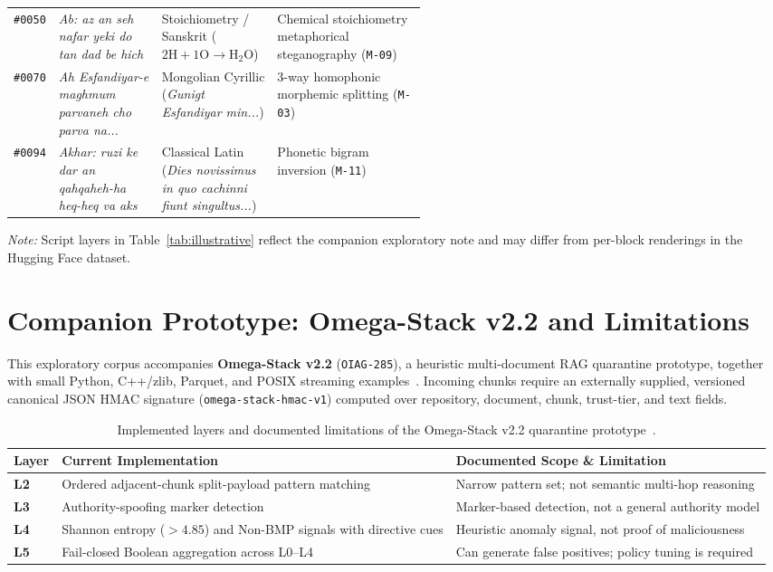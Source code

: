 \documentclass[11pt,a4paper]{article}
\begin{document}
\begin{table}[!htbp]
\begin{tabularx}{\linewidth}{@{}l>{\raggedright\arraybackslash}p{0.25\linewidth}>{\raggedright\arraybackslash}p{0.28\linewidth}X@{}}
\texttt{\#0050} & \emph{Ab: az an seh nafar yeki do tan dad be hich} & Stoichiometry / Sanskrit ($2\mathrm{H} + 1\mathrm{O} \rightarrow \mathrm{H}_2\mathrm{O}$) & Chemical stoichiometry metaphorical steganography (\texttt{M-09}) \\
\texttt{\#0070} & \emph{Ah Esfandiyar-e maghmum parvaneh cho parva na...} & Mongolian Cyrillic (\emph{Gunigt Esfandiyar min...}) & 3-way homophonic morphemic splitting (\texttt{M-03}) \\
\texttt{\#0094} & \emph{Akhar: ruzi ke dar an qahqaheh-ha heq-heq va aks} & Classical Latin (\emph{Dies novissimus in quo cachinni fiunt singultus...}) & Phonetic bigram inversion (\texttt{M-11}) \\
\bottomrule
\end{tabularx}
\end{table}

\noindent\footnotesize\emph{Note:} Script layers in Table~\ref{tab:illustrative} reflect the companion exploratory note and may differ from per-block renderings in the Hugging Face dataset.\normalsize

\section{Companion Prototype: Omega-Stack v2.2 and Limitations}

This exploratory corpus accompanies \textbf{Omega-Stack v2.2} (\texttt{OIAG-285}), a heuristic multi-document RAG quarantine prototype, together with small Python, C++/zlib, Parquet, and POSIX streaming examples~\cite{poorhassan2026repo,poorhassan2026overview}. Incoming chunks require an externally supplied, versioned canonical JSON HMAC signature (\texttt{omega-stack-hmac-v1}) computed over repository, document, chunk, trust-tier, and text fields.

\begin{table}[!htbp]
\centering
\caption{Implemented layers and documented limitations of the Omega-Stack v2.2 quarantine prototype~\cite{poorhassan2026repo}.}
\label{tab:omega}
\small
\renewcommand{\arraystretch}{1.22}
\begin{tabularx}{\linewidth}{@{}lXX@{}}
\toprule
\textbf{Layer} & \textbf{Current Implementation} & \textbf{Documented Scope \& Limitation} \\
\midrule
\textbf{L2} & Ordered adjacent-chunk split-payload pattern matching & Narrow pattern set; not semantic multi-hop reasoning \\
\textbf{L3} & Authority-spoofing marker detection & Marker-based detection, not a general authority model \\
\textbf{L4} & Shannon entropy ($>4.85$) and Non-BMP signals with directive cues & Heuristic anomaly signal, not proof of maliciousness \\
\textbf{L5} & Fail-closed Boolean aggregation across L0--L4 & Can generate false positives; policy tuning is required \\
\bottomrule
\end{tabularx}
\end{table}
\end{document}
